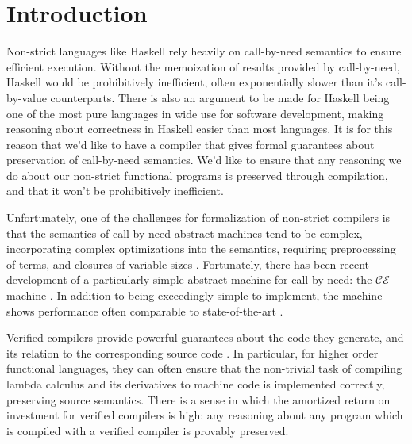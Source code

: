 \section{Introduction} \label{sec:introduction}
Non-strict languages like Haskell rely heavily on call-by-need semantics to
ensure efficient execution. Without the memoization of results provided by
call-by-need, Haskell would be prohibitively inefficient, often exponentially
slower than it's call-by-value counterparts. There is also an argument to be
made for Haskell being one of the most pure languages in wide use for software
development, making reasoning about correctness in Haskell easier than most
languages. It is for this reason that we'd like to have a compiler that gives
formal guarantees about preservation of call-by-need semantics. We'd like to
ensure that any reasoning we do about our non-strict functional programs is
preserved through compilation, and that it won't be prohibitively inefficient.

Unfortunately, one of the challenges for formalization of non-strict compilers
is that the semantics of call-by-need abstract machines tend to be complex,
incorporating complex optimizations into the semantics, requiring preprocessing
of terms, and closures of variable sizes \cite{jonesstg, TIM}. Fortunately, there has
been recent development of a particularly simple abstract machine for
call-by-need: the $\mathcal{CE}$ machine \cite{cem}. In addition to being
exceedingly simple to implement, the machine shows performance often comparable
to state-of-the-art \cite{cem}.

Verified compilers provide powerful guarantees about the code they generate, and
its relation to the corresponding source code \cite{chlipala2007certified,
leroy2012compcert, cakeml14}.  In particular, for higher order functional
languages, they can often ensure that the non-trivial task of compiling lambda
calculus and its derivatives to machine code is implemented correctly,
preserving source semantics. There is a sense in which the amortized return on
investment for verified compilers is high: any reasoning about any program which
is compiled with a verified compiler is provably preserved. 

